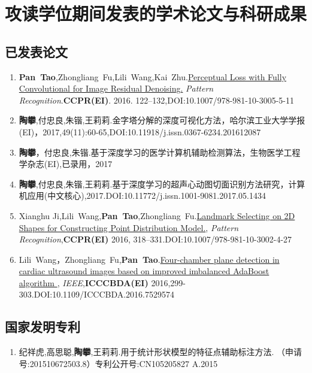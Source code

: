 
\chapter{攻读学位期间发表的学术论文与科研成果}

\section*{已发表论文}
\begin{enumerate}
\item {\textbf{Pan~Tao},Zhongliang~Fu,Lili~Wang,Kai~Zhu.{\href{http://link.springer.com/10.1007/978-981-10-3005-5_11}{Perceptual Loss with Fully Convolutional for Image Residual Denoising.}{ \textit{Pattern Recognition}}.\textbf{CCPR(EI)}. 2016. 122--132,DOI:10.1007/978-981-10-3005-5-11}}

\item {\textbf{陶攀},付忠良,朱锴,王莉莉.{金字塔分解的深度可视化方法}，{哈尔滨工业大学学报(EI)}，2017,49(11):60-65,DOI:10.11918/j.issn.0367-6234.201612087}
\item{\textbf{陶攀}，付忠良,朱锴.{基于深度学习的医学计算机辅助检测算法}，{生物医学工程学杂志(EI),已录用}，2017}
\item {\textbf{陶攀},付忠良,朱锴,王莉莉.{基于深度学习的超声心动图切面识别方法研究}，{计算机应用(中文核心),2017.DOI:10.11772/j.issn.1001-9081.2017.05.1434} }
\item{Xianghu Ji,Lili~Wang,\textbf{Pan~Tao},Zhongliang~Fu.{\href{http://link.springer.com/10.1007/978-981-10-3002-4_27}{Landmark Selecting on 2D Shapes for Constructing Point Distribution Model.},{ \textit{Pattern Recognition}},\textbf{CCPR(EI)} 2016, 318--331.DOI:10.1007/978-981-10-3002-4-27}}
\item {Lili~Wang，Zhongliang~Fu,\textbf{Pan~Tao}.{\href{http://ieeexplore.ieee.org/document/7529574}{Four-chamber plane detection in cardiac ultrasound images based on improved imbalanced AdaBoost algorithm },{ \textit{IEEE}},\textbf{ICCCBDA(EI)} 2016,299-303.DOI:10.1109/ICCCBDA.2016.7529574}}
\end{enumerate}
\section*{国家发明专利}
\begin{enumerate}
\item { 纪祥虎,高思聪,\textbf{陶攀},王莉莉.{用于统计形状模型的特征点辅助标注方法. {（申请号:201510672503.8）专利公开号:CN105205827 A}.{2015}}}
\end{enumerate}
